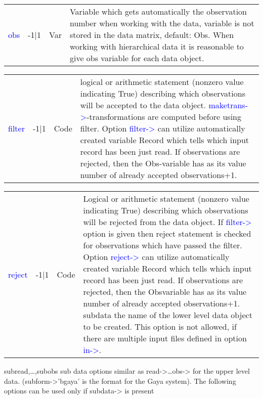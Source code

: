 \vspace{-1.51em}
\begin{table}[H]
\begin{tabular}{ m{}  m{}m{}p{}}
 \textcolor{blue}{obs}&-1|1&Var& Variable which gets automatically the observation number when working with the
 data, variable is not stored in the data matrix, default: Obs. When working with
 hierarchical data it is reasonable to give obs variable for each data object.

\\ \cline{1-4}
\end{tabular}
\end{table}
\vspace{-1.51em}
\begin{table}[H]
\begin{tabular}{ m{}  m{}m{}p{}}
 \textcolor{blue}{filter}&-1|1&Code& logical or arithmetic statement (nonzero value indicating True) describing which
 observations will be accepted to the data object. \textcolor{blue}{maketrans->}-transformations are
 computed before using filter. Option \textcolor{blue}{filter->} can utilize automatically created
 variable Record which tells which input record has been just read. If observations
 are rejected, then the Obs-variable has as its value number of already accepted
 observations+1.

\\ \cline{1-4}
\end{tabular}
\end{table}
\vspace{-1.51em}
\begin{table}[H]
\begin{tabular}{ m{}  m{}m{}p{}}
 \textcolor{blue}{reject} &-1|1&Code& Logical or arithmetic statement (nonzero value indicating True) describing which
 observations will be rejected from the data object. If \textcolor{blue}{filter->} option is given then
 reject statement is checked for observations which have passed the filter. Option
 \textcolor{blue}{reject->} can utilize automatically created variable Record which tells which
 input record has been just read. If observations are rejected, then the Obsvariable has as its value number of already accepted observations+1.
 subdata the name of the lower level data object to be created. This option is not allowed, if
 there are multiple input files defined in option \textcolor{blue}{in->}.
\\ \cline{1-4}
\end{tabular}
\end{table}
 subread,…,subobs sub data options similar as read->…obs-> for the upper level data.
 (subform->'bgaya' is the format for the Gaya system). The following options
 can be used only if subdata-> is present

